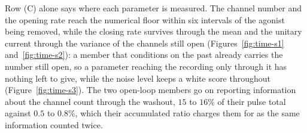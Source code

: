 Row (C) alone says where each parameter is measured. The channel number and the opening rate reach
the numerical floor within six intervals of the agonist being removed, while the closing rate
survives through the mean and the unitary current through the variance of the channels still open
(Figures~\ref{fig:time-s1} and~\ref{fig:time-s2}): a member that conditions on the past already
carries the number still open, so a parameter reaching the recording only through it has nothing
left to give, while the noise level keeps a white score throughout (Figure~\ref{fig:time-s3}). The two open-loop members go on reporting
information about the channel count through the washout, $15$ to $16\%$ of their pulse total against
$0.5$ to $0.8\%$, which their accumulated ratio charges them for as the same information counted
twice.

